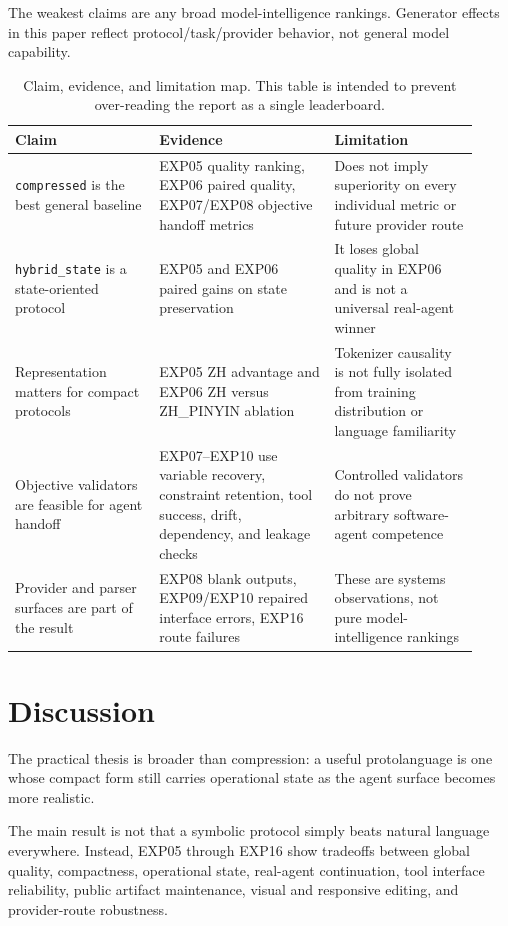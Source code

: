 \documentclass[11pt]{article}
\begin{document}
The weakest claims are any broad model-intelligence rankings. Generator effects in this paper reflect protocol/task/provider behavior, not general model capability.

\begin{table}[ht]
\centering
\small
\begin{tabular}{p{0.29\linewidth}p{0.34\linewidth}p{0.29\linewidth}}
\toprule
Claim & Evidence & Limitation \\
\midrule
\texttt{compressed} is the best general baseline & EXP05 quality ranking, EXP06 paired quality, EXP07/EXP08 objective handoff metrics & Does not imply superiority on every individual metric or future provider route \\
\texttt{hybrid\_state} is a state-oriented protocol & EXP05 and EXP06 paired gains on state preservation & It loses global quality in EXP06 and is not a universal real-agent winner \\
Representation matters for compact protocols & EXP05 ZH advantage and EXP06 ZH versus ZH\_PINYIN ablation & Tokenizer causality is not fully isolated from training distribution or language familiarity \\
Objective validators are feasible for agent handoff & EXP07--EXP10 use variable recovery, constraint retention, tool success, drift, dependency, and leakage checks & Controlled validators do not prove arbitrary software-agent competence \\
Provider and parser surfaces are part of the result & EXP08 blank outputs, EXP09/EXP10 repaired interface errors, EXP16 route failures & These are systems observations, not pure model-intelligence rankings \\
\bottomrule
\end{tabular}
\caption{Claim, evidence, and limitation map. This table is intended to prevent over-reading the report as a single leaderboard.}
\label{tab:claim_evidence_limitations}
\end{table}

\section{Discussion}
The practical thesis is broader than compression: a useful protolanguage is one whose compact form still carries operational state as the agent surface becomes more realistic.

The main result is not that a symbolic protocol simply beats natural language everywhere. Instead, EXP05 through EXP16 show tradeoffs between global quality, compactness, operational state, real-agent continuation, tool interface reliability, public artifact maintenance, visual and responsive editing, and provider-route robustness.
\end{document}
